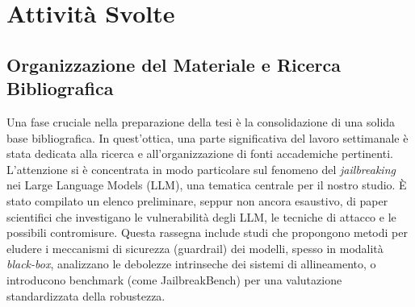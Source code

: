 \documentclass[11pt, a4paper]{article}
\begin{document}
\section{Attività Svolte}

\subsection{Organizzazione del Materiale e Ricerca Bibliografica}
Una fase cruciale nella preparazione della tesi è la consolidazione di una solida base bibliografica. In quest'ottica, una parte significativa del lavoro settimanale è stata dedicata alla ricerca e all'organizzazione di fonti accademiche pertinenti. L'attenzione si è concentrata in modo particolare sul fenomeno del \textit{jailbreaking} nei Large Language Models (LLM), una tematica centrale per il nostro studio.
È stato compilato un elenco preliminare, seppur non ancora esaustivo, di paper scientifici che investigano le vulnerabilità degli LLM, le tecniche di attacco e le possibili contromisure. Questa rassegna include studi che propongono metodi per eludere i meccanismi di sicurezza (guardrail) dei modelli, spesso in modalità \textit{black-box}, analizzano le debolezze intrinseche dei sistemi di allineamento, o introducono benchmark (come JailbreakBench) per una valutazione standardizzata della robustezza.
\end{document}
